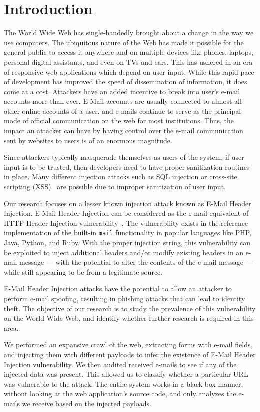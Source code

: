 \section{Introduction}
	The World Wide Web has single-handedly brought about a change in the way we use computers. The ubiquitous nature of the Web has made it possible for the general public to access it anywhere and on multiple devices like phones, laptops, personal digital assistants, and even on TVs and cars. This has ushered in an era of responsive web applications which depend on user input. While this rapid pace of development has improved the speed of dissemination of information, it does come at a cost. Attackers have an added incentive to break into user's e-mail accounts more than ever. E-Mail accounts are usually connected to almost all other online accounts of a user, and e-mails continue to serve as the principal mode of official communication on the web for most institutions. Thus, the impact an attacker can have by having control over the e-mail communication sent by websites to users is of an enormous magnitude.

	Since attackers typically masquerade themselves as users of the system, if user input is to be trusted, then developers need to have proper sanitization routines in place. Many different injection attacks such as SQL injection or cross-site scripting (XSS)~\cite{OWASPT10} are possible due to improper sanitization of user input.

	Our research focuses on a lesser known injection attack known as E-Mail Header Injection. E-Mail Header Injection can be considered as the e-mail equivalent of HTTP Header Injection vulnerability~\cite{wiki:HTTP_headerinjection}. The vulnerability exists in the reference implementation of the built-in \texttt{mail} functionality in popular languages like PHP, Java, Python, and Ruby. With the proper injection string, this vulnerability can be exploited to inject additional headers and/or modify existing headers in an e-mail message --- with the potential to alter the contents of the e-mail message --- while still appearing to be from a legitimate source.

	E-Mail Header Injection attacks have the potential to allow an attacker to perform e-mail spoofing, resulting in phishing attacks that can lead to identity theft.
	The objective of our research is to study the prevalence of this vulnerability on the World Wide Web, and identify whether further research is required in this area.

	We performed an expansive crawl of the web, extracting forms with e-mail fields, and injecting them with different payloads to infer the existence of E-Mail Header Injection vulnerability. We then audited received e-mails to see if any of the injected data was present. This allowed us to classify whether a particular URL was vulnerable to the attack. The entire system works in a black-box manner, without looking at the web application's source code, and only analyzes the e-mails we receive based on the injected payloads.

